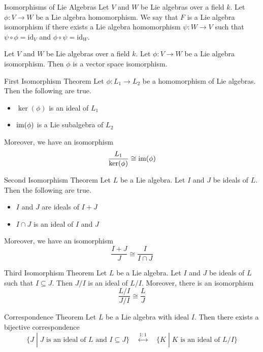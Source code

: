 \documentclass[a4paper]{article}
\begin{document}
\begin{defn}{Isomorphisms of Lie Algebras}{} Let $V$ and $W$ be Lie algebras over a field $k$. Let $\phi:V\to W$ be a Lie algebra homomorphism. We say that $F$ is a Lie algebra isomorphism if there exists a Lie algebra homomorphism $\psi:W\to V$ such that $\psi\circ\phi=\text{id}_V$ and $\phi\circ\psi=\text{id}_W$. 
\end{defn}

\begin{prp}{}{} Let $V$ and $W$ be Lie algebras over a field $k$. Let $\phi:V\to W$ be a Lie algebra isomorphism. Then $\phi$ is a vector space isomorphism. 
\end{prp}

\begin{thm}{First Isomorphism Theorem}{} Let $\phi:L_1\to L_2$ be a homomorphism of Lie algebras. Then the following are true. 
\begin{itemize}
\item $\ker(\phi)$ is an ideal of $L_1$
\item $\operatorname{im}(\phi)$ is a Lie subalgebra of $L_2$
\end{itemize}
Moreover, we have an isomorphism $$\frac{L_1}{\ker(\phi)}\cong\operatorname{im}(\phi)$$
\end{thm}

\begin{thm}{Second Isomorphism Theorem}{} Let $L$ be a Lie algebra. Let $I$ and $J$ be ideals of $L$. Then the following are true. 
\begin{itemize}
\item $I$ and $J$ are ideals of $I+J$
\item $I\cap J$ is an ideal of $I$ and $J$
\end{itemize}
Moreover, we have an isomorphism $$\frac{I+J}{J}\cong\frac{I}{I\cap J}$$
\end{thm}

\begin{thm}{Third Isomorphism Theorem}{} Let $L$ be a Lie algebra. Let $I$ and $J$ be ideals of $L$ such that $I\subseteq J$. Then $J/I$ is an ideal of $L/I$. Moreover, there is an isomorphism $$\frac{L/I}{J/I}\cong\frac{L}{J}$$
\end{thm}

\begin{thm}{Correspondence Theorem}{} Let $L$ be a Lie algebra with ideal $I$. Then there exists a bijective correspondence $$\{J\;|\;J\text{ is an ideal of }L\text{ and }I\subseteq J\}\;\;\;\;\overset{1:1}{\longleftrightarrow}\;\;\;\;\{K\;|\;K\text{ is an ideal of }L/I\}$$
\end{thm}
\end{document}
